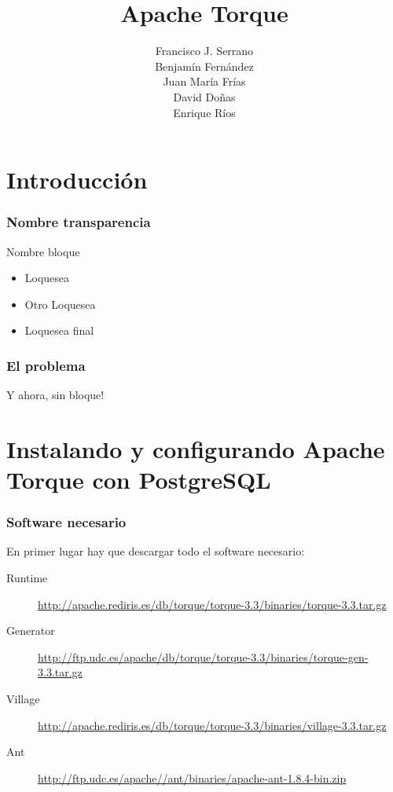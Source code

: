 \documentclass[24pt, a4paper, oneside, spanish]{beamer}
\begin{document}
\title{Apache Torque}
\author{
	Francisco J. Serrano\\
	Benjamín Fernández\\
	Juan María Frías\\
	David Doñas\\
	Enrique Ríos
}

\begin{frame}
\titlepage
\end{frame}

\section{Introducción}

\begin{frame}
	\frametitle{Nombre transparencia}
	
	\begin{block}{Nombre bloque}
		\pause
		
		\begin{itemize}
		\item Loquesea
		\pause
		\item Otro Loquesea
		\pause
		\item Loquesea final
		\end{itemize}
	\end{block}
\end{frame}

\begin{frame}
	\frametitle{El problema}
	Y ahora, sin \pause bloque!
\end{frame}

\section{Instalando y configurando Apache Torque con PostgreSQL}

\begin{frame}
	\frametitle{Software necesario}
	
	En primer lugar hay que descargar todo el software necesario:
	\begin{description}
	\item[Runtime] \url{http://apache.rediris.es/db/torque/torque-3.3/binaries/torque-3.3.tar.gz}
	\item[Generator] \url{http://ftp.udc.es/apache/db/torque/torque-3.3/binaries/torque-gen-3.3.tar.gz}
	\item[Village] \url{http://apache.rediris.es/db/torque/torque-3.3/binaries/village-3.3.tar.gz}
	\item[Ant] \url{http://ftp.udc.es/apache//ant/binaries/apache-ant-1.8.4-bin.zip}
	\end{description}
\end{frame}
\end{document}

